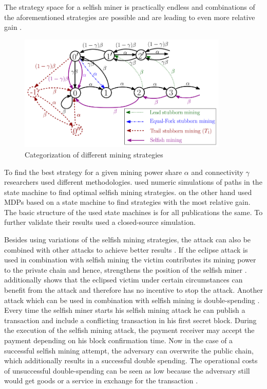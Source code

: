 \documentclass{scrartcl}
\begin{document}
The strategy space for a selfish miner is practically endless and combinations of the aforementioned strategies are possible and are leading to even more relative gain \cite{nayak2016stubborn,sapirshtein2016optimal, gervais2015tampering, gervais2016security, bahack2013theoretical}.


\begin{figure}[t]
\includegraphics[width=10cm]{figures/stubborn_mining}
\centering
\caption{Categorization of different mining strategies \cite{nayak2016stubborn}}
\label{fig:stubborn_mining}
\end{figure}


To find the best strategy for a given mining power share $\alpha$ and connectivity $\gamma$ researchers used different methodologies. \cite{gervais2015tampering, nayak2016stubborn} used numeric simulations of paths in the state machine to find optimal selfish mining strategies. \cite{sapirshtein2016optimal, gervais2016security} on the other hand used MDPs based on a state machine to find strategies with the most relative gain. The basic structure of the used state machines is for all publications the same. To further validate their results \citep{eyal2014majority, sapirshtein2016optimal} used a closed-source simulation.

Besides using variations of the selfish mining strategies, the attack can also be combined with other attacks to achieve better results \cite{gervais2016security, sapirshtein2016optimal, nayak2016stubborn, gervais2015tampering}. If the eclipse attack is used in combination with selfish mining the victim contributes its mining power to the private chain and hence, strengthens the position of the selfish miner \cite{nayak2016stubborn, gervais2016security}. \cite{nayak2016stubborn} additionally shows that the eclipsed victim under certain circumstances can benefit from the attack and therefore has no incentive to stop the attack. Another attack which can be used in combination with selfish mining is double-spending \cite{sapirshtein2016optimal, gervais2016security}. Every time the selfish miner starts his selfish mining attack he can publish a transaction and include a conflicting transaction in his first secret block. During the execution of the selfish mining attack, the payment receiver may accept the payment depending on his block confirmation time. Now in the case of a successful selfish mining attempt, the adversary can overwrite the public chain, which additionally results in a successful double spending. The operational costs of unsuccessful double-spending can be seen as low because the adversary still would get goods or a service in exchange for the transaction \cite{sapirshtein2016optimal, gervais2016security}.
\end{document}
